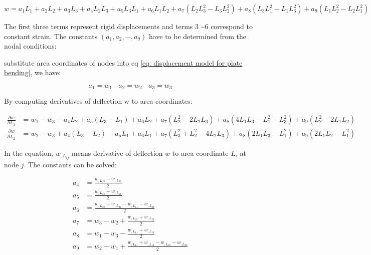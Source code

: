 \begin{equation}\label{eq: displacement model for plate bending}
w = a_1 L_1 + a_2 L_2 + a_3 L_3 + a_4 L_2 L_3 + a_5 L_3 L_1 + a_6 L_1 L_2 + a_7 (L_2 L_3^2 - L_3 L_2^2) + a_8 (L_3 L_1^2-L_1 L_3^2) + a_9(L_1 L_2^2 - L_2 L_1^2)
\end{equation}

The first three terms represent rigid displacements and terms 3 \textasciitilde 6 correspond to constant strain. The constants $ (a_1, a_2, \cdots, a_9) $ have to be determined from the nodal conditions:

substitute area coordinates of nodes into eq \ref{eq: displacement model for plate bending}, we have:

\begin{equation} \label{eq: constant terms 1-3}
a_1 = w_1~~~~a_2 = w_2~~~~a_3 = w_3
\end{equation}

By computing derivatives of deflection w to area coordinates:

\begin{equation} \label{eq: derivatives of deflection to area coordinates for plate bending}
\begin{split}
\frac{\partial w}{\partial L_1}	&= w_1 - w_3 - a_4 L_2 + a_5 (L_3-L_1) + a_6 L_2 + a_7(L_2^2-2L_2L_3) + a_8(4L_1 L_3 - L_1^2 - L_3^2) + a_9(L_2^2 - 2L_1 L_2) \\
\frac{\partial w}{\partial L_2}	&= w_2 - w_3 + a_4 (L_3-L_2) - a_5 L_1 + a_6 L_1 + a_7(L_3^2 + L_2^2 - 4L_2 L_3) + a_8(2L_1 L_3 - L_1^2) + a_9(2L_1 L_2 - L_1^2)
\end{split}
\end{equation}

In the equation, $ w_{,L_{ij}} $ means derivative of deflection $ w $ to area coordinate $ L_i $ at node $ j $. The constants can be solved:

\begin{equation} \label{eq: constant terms 4-9}
\begin{split}
a_4 &= \frac{w_{,L_{23}} - w_{,L_{22}}}{2} \\
a_5 &= \frac{w_{,L_{13}} - w_{,L_{11}}}{2} \\
a_6 &= \frac{w_{,L_{12}} + w_{,L_{21}} - w_{,L_{11}} - w_{,L_{22}}}{2} \\
a_7 &= w_3 - w_2 + \frac{w_{,L_{23}} + w_{,L_{22}}}{2} \\
a_8 &= w_1 - w_3 - \frac{w_{,L_{11}} + w_{,L_{13}}}{2} \\
a_9 &= w_2 - w_1 + \frac{w_{,L_{11}} + w_{,L_{12}} - w_{,L_{21}} - w_{,L_{22}}}{2}
\end{split}
\end{equation}

